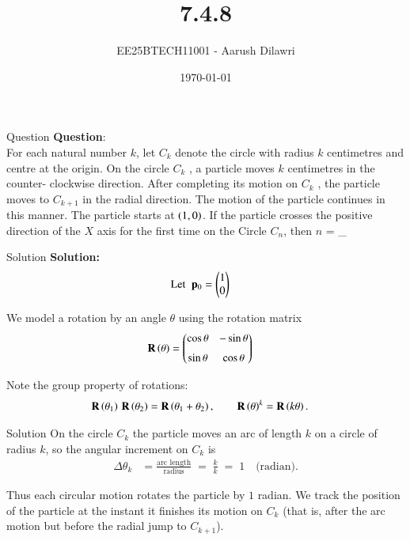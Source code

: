 \documentclass{beamer}
\title{7.4.8}
\date{\today}
\author{EE25BTECH11001 - Aarush Dilawri}
\begin{document}
\frame{\titlepage}

\begin{frame}{Question}
\textbf{Question}:\\
For each natural number $k$, let $C_k$ denote the circle with radius $k$ centimetres and
centre at the origin. On the circle $C_k$ , a particle moves $k$ centimetres in the counter-
clockwise direction. After completing its motion on $C_k$ , the particle moves to $C_{k+1}$ in the radial direction. The motion of the particle continues in this manner. The particle
starts at $\left(1,0\right)$. If the particle crosses the positive direction of the $X$ axis for the first time on the Circle $C_n$, then $n$ = \_
\end{frame}

\begin{frame}{Solution}
\textbf{Solution:} \\
\begin{align}
    \text{Let }\; \mathbf{p}_0 &= \begin{pmatrix}1 \\ 0\end{pmatrix} 
\end{align}

We model a rotation by an angle $\theta$ using the rotation matrix
\begin{align}
    \mathbf{R}\left(\theta\right) &= \begin{pmatrix}\cos\theta & -\sin\theta \\[6pt] \sin\theta & \cos\theta\end{pmatrix}
\end{align}

Note the group property of rotations:
\begin{align}
    \mathbf{R}\left(\theta_1\right)\,\mathbf{R}\left(\theta_2\right) &= \mathbf{R}\left(\theta_1+\theta_2\right),
    \qquad \mathbf{R}\left(\theta\right)^k = \mathbf{R}\left(k\theta\right).
\end{align}
\end{frame}

\begin{frame}{Solution}
On the circle $C_k$ the particle moves an arc of length $k$ on a circle of radius $k$, 
so the angular increment on $C_k$ is
\begin{align}
    \Delta\theta_k &= \frac{\text{arc length}}{\text{radius}} \;=\; \frac{k}{k} \;=\; 1 \quad\text{(radian).}
\end{align}

Thus each circular motion rotates the particle by $1$ radian.  We track the position of the particle at the instant it finishes its motion on $C_k$ (that is, after the arc motion but before the radial jump to $C_{k+1}$).  
\end{frame}
\end{document}
